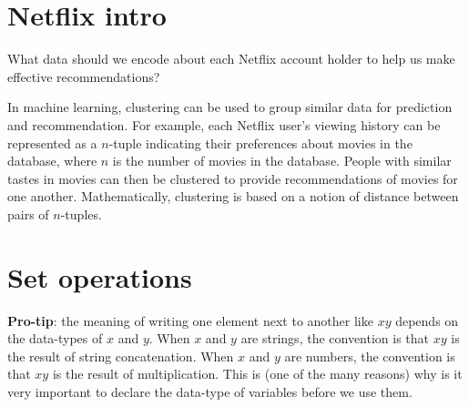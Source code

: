 \documentclass[12pt, oneside]{article}
\begin{document}
\begin{flushright}
\end{flushright} \section*{Netflix intro}


What data should we encode about each Netflix account holder to help us make effective recommendations?

\vfill
\vfill

In machine learning, clustering can be used to group similar data for prediction and recommendation.  For example,
each Netflix user's viewing history can be represented as a $n$-tuple indicating their preferences about
movies in the database, where $n$ is the number of movies in the database.  People with similar tastes in movies can then be clustered to provide recommendations
of movies for one another.  Mathematically, clustering is based on a notion of distance between pairs of $n$-tuples.
 \vfill
\section*{Set operations}



{\bf Pro-tip}: the meaning of writing one element next to another like $xy$ depends on the data-types of $x$ and 
$y$. When $x$ and $y$ are strings, the convention is that $xy$ is the result of string concatenation. 
When $x$ and $y$ are numbers, the convention is that $xy$ is the result of multiplication. This is 
(one of the many reasons) why is it very important to declare the data-type of variables before we use them.
\end{document}
